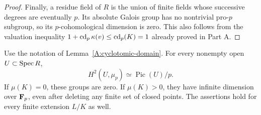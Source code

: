 \begin{proof}
Finally, a residue field of $R$ is the union of finite fields whose
successive degrees are eventually $p$. Its absolute Galois group has
no nontrivial pro-$p$ subgroup, so its $p$-cohomological dimension is
zero. This also follows from the valuation inequality
$1+\operatorname{cd}_p\kappa(v)\leq\operatorname{cd}_p(K)=1$ already proved in Part A.
\end{proof}

\begin{lemma}
\label{A:cyclotomic-Pic}
Use the notation of Lemma~\ref{A:cyclotomic-domain}. For every nonempty
open $U\subset\operatorname{Spec} R$,
\[
 H^2(U,\mu_p)\simeq\operatorname{Pic}(U)/p.
\]
If $\mu(K)=0$, these groups are zero. If $\mu(K)>0$, they have infinite
dimension over $\mathbf F_p$, even after deleting any finite set of closed
points. The assertions hold for every finite extension $L/K$ as well.
\end{lemma}
